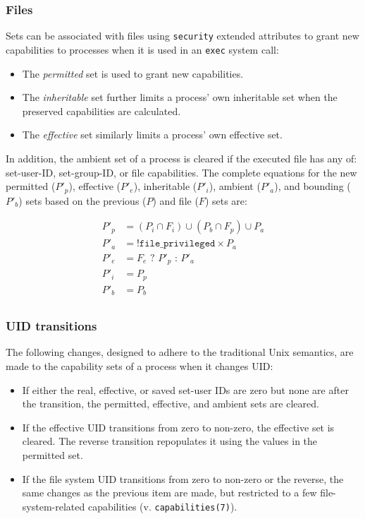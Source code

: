 \subsubsection{Files}

Sets can be associated with files using \texttt{security} extended attributes to
grant new capabilities to processes when it is used in an \texttt{exec} system
call:

\begin{itemize}
    \item The \textit{permitted} set is used to grant new capabilities.
    \item
        The \textit{inheritable} set further limits a process' own inheritable
        set when the preserved capabilities are calculated.
    \item
        The \textit{effective} set similarly limits a process' own effective
        set.
\end{itemize}

In addition, the ambient set of a process is cleared if the executed file has
any of: set-user-ID, set-group-ID, or file capabilities.  The complete equations
for the new permitted ($P'_p$), effective ($P'_e$), inheritable ($P'_i$),
ambient ($P'_a$), and bounding ($P'_b$) sets based on the previous ($P$) and
file ($F$) sets are:

\begin{align*}
    P'_p &= (P_i \cap F_i) \cup (P_b \cap F_p) \cup P_a \\
    P'_a &= \texttt{!file\_privileged} \times P_a \\
    P'_e &= F_e\text{ ? }P'_p\text{ : }P'_a \\
    P'_i &= P_p \\
    P'_b &= P_b \\
\end{align*}

\subsubsection{UID transitions}

The following changes, designed to adhere to the traditional Unix semantics, are
made to the capability sets of a process when it changes UID:

\begin{itemize}
    \item
        If either the real, effective, or saved set-user IDs are zero but none
        are after the transition, the permitted, effective, and ambient sets are
        cleared.
    \item
        If the effective UID transitions from zero to non-zero, the effective
        set is cleared.  The reverse transition repopulates it using the values
        in the permitted set.
    \item
        If the file system UID transitions from zero to non-zero or the reverse,
        the same changes as the previous item are made, but restricted to a few
        file-system-related capabilities (v. \texttt{capabilities(7)}).
\end{itemize}

